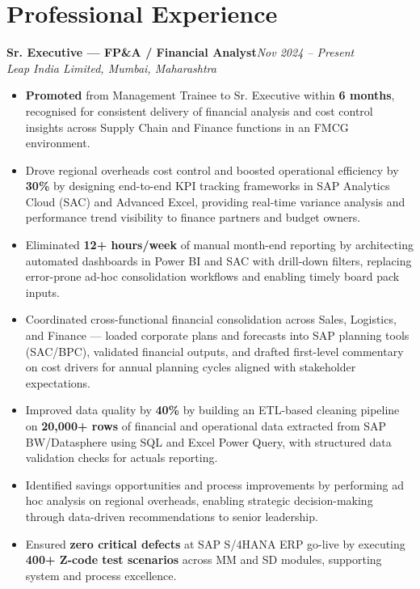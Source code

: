 \documentclass[10pt, letterpaper]{article}
\newcommand{\role}[3]{%
  \vspace{2pt}%
  {\bfseries #1}\hfill{\small\color{muted}\textit{#3}}\\[-2pt]%
  {\small\color{muted}\textit{#2}}%
}
\begin{document}
\section{Professional Experience}

\role{Sr. Executive — FP\&A / Financial Analyst}{Leap India Limited, Mumbai, Maharashtra}{Nov 2024 – Present}

\begin{itemize}
  \item \textbf{Promoted} from Management Trainee to Sr. Executive within \textbf{6 months}, recognised for consistent delivery of financial analysis and cost control insights across Supply Chain and Finance functions in an FMCG environment.
  \item Drove regional overheads cost control and boosted operational efficiency by \textbf{30\%} by designing end-to-end KPI tracking frameworks in SAP Analytics Cloud (SAC) and Advanced Excel, providing real-time variance analysis and performance trend visibility to finance partners and budget owners.
  \item Eliminated \textbf{12+ hours/week} of manual month-end reporting by architecting automated dashboards in Power BI and SAC with drill-down filters, replacing error-prone ad-hoc consolidation workflows and enabling timely board pack inputs.
  \item Coordinated cross-functional financial consolidation across Sales, Logistics, and Finance — loaded corporate plans and forecasts into SAP planning tools (SAC/BPC), validated financial outputs, and drafted first-level commentary on cost drivers for annual planning cycles aligned with stakeholder expectations.
  \item Improved data quality by \textbf{40\%} by building an ETL-based cleaning pipeline on \textbf{20,000+ rows} of financial and operational data extracted from SAP BW/Datasphere using SQL and Excel Power Query, with structured data validation checks for actuals reporting.
  \item Identified savings opportunities and process improvements by performing ad hoc analysis on regional overheads, enabling strategic decision-making through data-driven recommendations to senior leadership.
  \item Ensured \textbf{zero critical defects} at SAP S/4HANA ERP go-live by executing \textbf{400+ Z-code test scenarios} across MM and SD modules, supporting system and process excellence.
\end{itemize}
\end{document}
